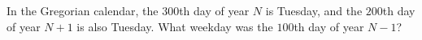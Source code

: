 In the Gregorian calendar, the $300$th day of year $N$ is Tuesday, and the $200$th day of year $N+1$ is also Tuesday. What weekday was the $100$th day of year $N-1$?
